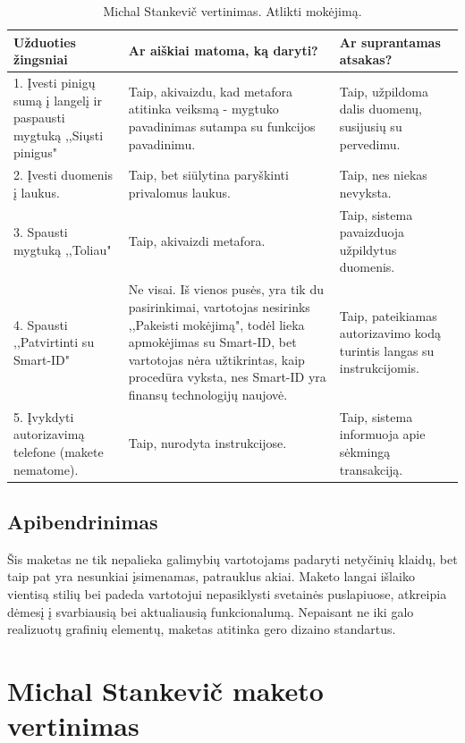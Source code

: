 \documentclass[oneside]{VUMIFPSkursinis}
\begin{document}
\begin{center}
	\begin{longtable}[!htb]{|p{5cm}|p{5cm}|p{5cm}|}
		\caption{Michal Stankevič vertinimas. Atlikti mokėjimą.}
	\endfirsthead
	\endhead
		\hline
		Užduoties žingsniai & Ar aiškiai matoma, ką daryti? & Ar suprantamas atsakas? \\ \hline
		1. Įvesti pinigų sumą į langelį ir paspausti mygtuką ,,Siųsti pinigus" & Taip, akivaizdu, kad metafora atitinka veiksmą - mygtuko pavadinimas sutampa su funkcijos pavadinimu. & Taip, užpildoma dalis duomenų, susijusių su pervedimu.   \\ \hline
		2. Įvesti duomenis į laukus. & Taip, bet siūlytina paryškinti privalomus laukus. & Taip, nes niekas nevyksta. \\ \hline
		3. Spausti mygtuką ,,Toliau" & Taip, akivaizdi metafora. & Taip, sistema pavaizduoja užpildytus duomenis. \\ \hline
		4. Spausti ,,Patvirtinti su Smart-ID" & Ne visai. Iš vienos pusės, yra tik du pasirinkimai, vartotojas nesirinks ,,Pakeisti mokėjimą", todėl lieka apmokėjimas su Smart-ID, bet vartotojas nėra užtikrintas, kaip procedūra vyksta, nes Smart-ID yra finansų technologijų naujovė. & Taip, pateikiamas autorizavimo kodą turintis langas su instrukcijomis. \\ \hline
		5. Įvykdyti autorizavimą telefone (makete nematome). & Taip, nurodyta instrukcijose. & Taip, sistema informuoja apie sėkmingą transakciją. \\ \hline
	\end{longtable}
	\end{center}
\subsection{Apibendrinimas}
Šis maketas ne tik nepalieka galimybių vartotojams padaryti netyčinių klaidų, bet taip pat yra nesunkiai įsimenamas, patrauklus akiai. Maketo langai išlaiko vientisą stilių bei padeda vartotojui nepasiklysti svetainės puslapiuose, atkreipia dėmesį į svarbiausią bei aktualiausią funkcionalumą. Nepaisant ne iki galo realizuotų grafinių elementų, maketas atitinka gero dizaino standartus.

\section{Michal Stankevič maketo vertinimas}
\end{document}
